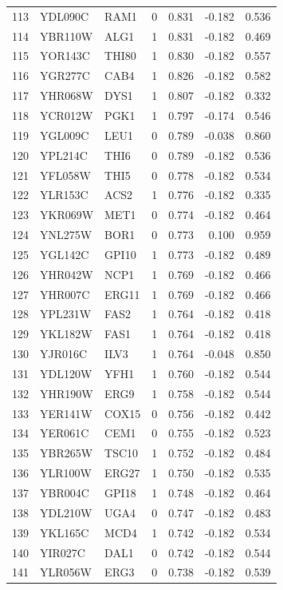\begin{longtable}{rllrrrr}
113 & YDL090C & RAM1 & 0 & 0.831 & -0.182 & 0.536\\
114 & YBR110W & ALG1 & 1 & 0.831 & -0.182 & 0.469\\
115 & YOR143C & THI80 & 1 & 0.830 & -0.182 & 0.557\\
116 & YGR277C & CAB4 & 1 & 0.826 & -0.182 & 0.582\\
117 & YHR068W & DYS1 & 1 & 0.807 & -0.182 & 0.332\\
118 & YCR012W & PGK1 & 1 & 0.797 & -0.174 & 0.546\\
119 & YGL009C & LEU1 & 0 & 0.789 & -0.038 & 0.860\\
120 & YPL214C & THI6 & 0 & 0.789 & -0.182 & 0.536\\
121 & YFL058W & THI5 & 0 & 0.778 & -0.182 & 0.534\\
122 & YLR153C & ACS2 & 1 & 0.776 & -0.182 & 0.335\\
123 & YKR069W & MET1 & 0 & 0.774 & -0.182 & 0.464\\
124 & YNL275W & BOR1 & 0 & 0.773 & 0.100 & 0.959\\
125 & YGL142C & GPI10 & 1 & 0.773 & -0.182 & 0.489\\
126 & YHR042W & NCP1 & 1 & 0.769 & -0.182 & 0.466\\
127 & YHR007C & ERG11 & 1 & 0.769 & -0.182 & 0.466\\
128 & YPL231W & FAS2 & 1 & 0.764 & -0.182 & 0.418\\
129 & YKL182W & FAS1 & 1 & 0.764 & -0.182 & 0.418\\
130 & YJR016C & ILV3 & 1 & 0.764 & -0.048 & 0.850\\
131 & YDL120W & YFH1 & 1 & 0.760 & -0.182 & 0.544\\
132 & YHR190W & ERG9 & 1 & 0.758 & -0.182 & 0.544\\
133 & YER141W & COX15 & 0 & 0.756 & -0.182 & 0.442\\
134 & YER061C & CEM1 & 0 & 0.755 & -0.182 & 0.523\\
135 & YBR265W & TSC10 & 1 & 0.752 & -0.182 & 0.484\\
136 & YLR100W & ERG27 & 1 & 0.750 & -0.182 & 0.535\\
137 & YBR004C & GPI18 & 1 & 0.748 & -0.182 & 0.464\\
138 & YDL210W & UGA4 & 0 & 0.747 & -0.182 & 0.483\\
139 & YKL165C & MCD4 & 1 & 0.742 & -0.182 & 0.534\\
140 & YIR027C & DAL1 & 0 & 0.742 & -0.182 & 0.544\\
141 & YLR056W & ERG3 & 0 & 0.738 & -0.182 & 0.539\\

\end{longtable}
